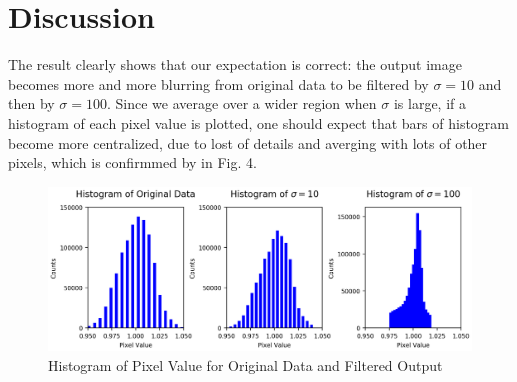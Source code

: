 \documentclass[a4paper,10pt]{article}
\begin{document}
\section*{Discussion}
\begin{large}
The result clearly shows that our expectation is correct: the output image becomes more and more blurring from original data to be filtered by $\sigma=10$  and then by $\sigma=100$. Since we average over a wider region when $\sigma$ is large, if a histogram of each pixel value is plotted, one should expect that bars of histogram become more centralized, due to lost of details and averging with lots of other pixels, which is confirmmed by in Fig. 4. \\
\begin{figure}[htbp] %
\centering %
\includegraphics[width=13cm]{pixel_value_histogram.png} %
\caption{Histogram of Pixel Value for Original Data and Filtered Output}
\end{figure}


\end{large}
\end{document}
